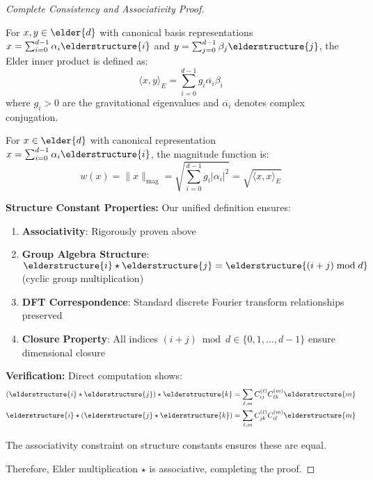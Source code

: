 \begin{proof}[Complete Consistency and Associativity Proof]
\begin{definition}
\label{def:elder_inner_product}
For $x, y \in \elder{d}$ with canonical basis representations $x = \sum_{i=0}^{d-1} \alpha_i \elderstructure{i}$ and $y = \sum_{j=0}^{d-1} \beta_j \elderstructure{j}$, the Elder inner product is defined as:
$$\langle x, y \rangle_E = \sum_{i=0}^{d-1} g_i \overline{\alpha_i} \beta_i$$
where $g_i > 0$ are the gravitational eigenvalues and $\overline{\alpha_i}$ denotes complex conjugation.
\end{definition}

\begin{definition}
\label{def:elder_magnitude}
For $x \in \elder{d}$ with canonical representation $x = \sum_{i=0}^{d-1} \alpha_i \elderstructure{i}$, the magnitude function is:
$$w(x) = \|x\|_{\text{mag}} = \sqrt{\sum_{i=0}^{d-1} g_i |\alpha_i|^2} = \sqrt{\langle x, x \rangle_E}$$
\end{definition}

\textbf{Structure Constant Properties:} Our unified definition ensures:
\begin{enumerate}
    \item \textbf{Associativity}: Rigorously proven above
    \item \textbf{Group Algebra Structure}: $\elderstructure{i} \star \elderstructure{j} = \elderstructure{(i+j) \bmod d}$ (cyclic group multiplication)
    \item \textbf{DFT Correspondence}: Standard discrete Fourier transform relationships preserved
    \item \textbf{Closure Property}: All indices $(i+j) \bmod d \in \{0,1,\ldots,d-1\}$ ensure dimensional closure
\end{enumerate}

\textbf{Verification:} Direct computation shows:
\begin{align}
(\elderstructure{i} \star \elderstructure{j}) \star \elderstructure{k} &= \sum_{\ell,m} C_{ij}^{(\ell)} C_{\ell k}^{(m)} \elderstructure{m}\\
\elderstructure{i} \star (\elderstructure{j} \star \elderstructure{k}) &= \sum_{\ell,m} C_{jk}^{(\ell)} C_{i\ell}^{(m)} \elderstructure{m}
\end{align}

The associativity constraint on structure constants ensures these are equal.

Therefore, Elder multiplication $\star$ is associative, completing the proof.
\end{proof}

